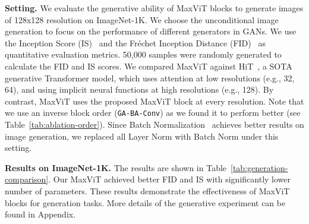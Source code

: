 \documentclass[runningheads]{llncs}
\begin{document}
\textbf{Setting.} We evaluate the generative ability of MaxViT blocks to generate images of 128x128 resolution on ImageNet-1K. We choose the unconditional image generation to focus on the performance of different generators in GANs. We use the Inception Score (IS)~\cite{salimans2016improved} and the Fr{\'e}chet Inception Distance (FID)~\cite{heusel2017gans} as quantitative evaluation metrics. 50,000 samples were randomly generated to calculate the FID and IS scores.
We compared MaxViT against HiT~\cite{zhao2021improved}, a SOTA generative Transformer model, which uses attention at low resolutions (e.g., 32, 64), and using implicit neural functions at high resolutions (e.g., 128). By contrast, MaxViT uses the proposed MaxViT block at every resolution. Note that we use an inverse block order (\texttt{GA-BA-Conv}) as we found it to perform better (see Table~\ref{tab:ablation-order}). Since Batch Normalization~\cite{ioffe2015batch,zhao2021improved} achieves better results on image generation, we replaced all Layer Norm with Batch Norm under this setting.

\noindent\textbf{Results on ImageNet-1K.} The results are shown in Table~\ref{tab:generation-comparison}. Our MaxViT achieved better FID and IS with significantly lower number of parameters. These results demonstrate the effectiveness of MaxViT blocks for generation tasks. More details of the generative experiment can be found in Appendix.
\end{document}

